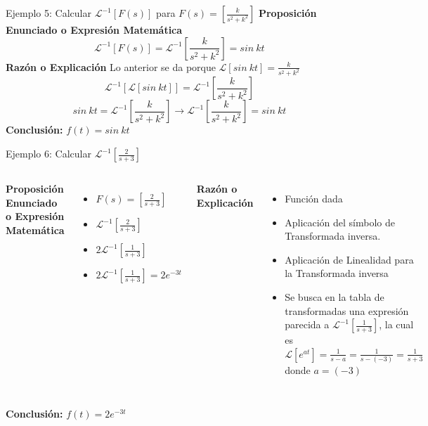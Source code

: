 \documentclass{beamer}
\begin{document}
\begin{frame}{Ejemplo 5: Calcular $\mathcal{L}^{-1}[F(s)]$ para $F(s)=[\frac{k}{s^{2}+k^{2}}]$}
    \centering
    \textbf{Proposición Enunciado o Expresión Matemática}
    \[
    \mathcal{L}^{-1}[F(s)]=\mathcal{L}^{-1}\left[\frac{k}{s^{2}+k^{2}}\right]=sin~kt \text{ }
    \]
    \textbf{Razón o Explicación}
    Lo anterior se da porque $\mathcal{L}[sin~kt]=\frac{k}{s^{2}+k^{2}}$ 
    \[
    \mathcal{L}^{-1}[\mathcal{L}[sin~kt]]=\mathcal{L}^{-1}\left[\frac{k}{s^{2}+k^{2}}\right] \text{ }
    \]
    \[
    sin~kt=\mathcal{L}^{-1}\left[\frac{k}{s^{2}+k^{2}}\right] \rightarrow \mathcal{L}^{-1}\left[\frac{k}{s^{2}+k^{2}}\right]=sin~kt \text{ }
    \]
    \textbf{Conclusión:} $f(t)=sin~kt$ 
\end{frame}

\begin{frame}{Ejemplo 6: Calcular $\mathcal{L}^{-1}[\frac{2}{s+3}]$}
    \begin{columns}
        \textbf{Proposición Enunciado o Expresión Matemática}
        \begin{itemize}
            \item $F(s)=[\frac{2}{s+3}]$ 
            \item $\mathcal{L}^{-1}[\frac{2}{s+3}]$ 
            \item $2\mathcal{L}^{-1}[\frac{1}{s+3}]$ 
            \item $2\mathcal{L}^{-1}[\frac{1}{s+3}]=2e^{-3t}$ 
        \end{itemize}
        \textbf{Razón o Explicación}
        \begin{itemize}
            \item Función dada 
            \item Aplicación del símbolo de Transformada inversa. 
            \item Aplicación de Linealidad para la Transformada inversa 
            \item Se busca en la tabla de transformadas una expresión parecida a $\mathcal{L}^{-1}[\frac{1}{s+3}]$, la cual es $\mathcal{L}[e^{at}]=\frac{1}{s-a}=\frac{1}{s-(-3)}=\frac{1}{s+3}$ donde $a=(-3)$ 
        \end{itemize}
    \end{columns}
    \textbf{Conclusión:} $f(t)=2e^{-3t}$ 
\end{frame}
\end{document}
